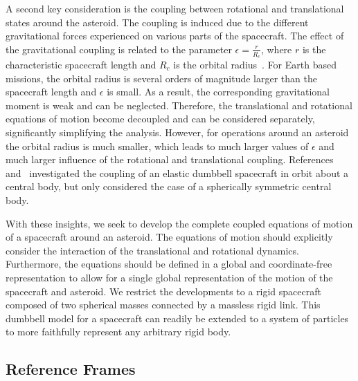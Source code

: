 A second key consideration is the coupling between rotational and translational states around the asteroid.
The coupling is induced due to the different gravitational forces experienced on various parts of the spacecraft.
The effect of the gravitational coupling is related to the parameter \(\epsilon = \frac{r}{R_c}\), where \(r\) is the characteristic spacecraft length and \(R_c\) is the orbital radius~\cite{hughes2004}.
For Earth based missions, the orbital radius is several orders of magnitude larger than the spacecraft length and \(\epsilon\) is small.
As a result, the corresponding gravitational moment is weak and can be neglected. 
Therefore, the translational and rotational equations of motion become decoupled and can be considered separately, significantly simplifying the analysis. 
However, for operations around an asteroid the orbital radius is much smaller, which leads to much larger values of \(\epsilon\) and much larger influence of the rotational and translational coupling.
References~\cite{elmasri2005} and~\cite{sanyal2004} investigated the coupling of an elastic dumbbell spacecraft in orbit about a central body, but only considered the case of a spherically symmetric central body.

With these insights, we seek to develop the complete coupled equations of motion of a spacecraft around an asteroid.
The equations of motion should explicitly consider the interaction of the translational and rotational dynamics.
Furthermore, the equations should be defined in a global and coordinate-free representation to allow for a single global representation of the motion of the spacecraft and asteroid.
We restrict the developments to a rigid spacecraft composed of two spherical masses connected by a massless rigid link.
This dumbbell model for a spacecraft can readily be extended to a system of particles to more faithfully represent  any arbitrary rigid body.

\subsection{Reference Frames}\label{ssec:dumbbell_eoms_reference_frames}

